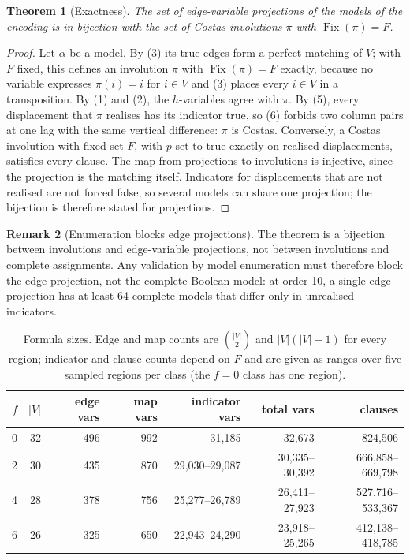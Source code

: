 \documentclass[11pt,a4paper]{article}
\newtheorem{theorem}{Theorem}
\theoremstyle{definition}
\newtheorem{remark}[theorem]{Remark}
\newcommand{\Fix}{\operatorname{Fix}}
\begin{document}
\begin{theorem}[Exactness]\label{thm:exact}
The set of edge-variable projections of the models of the encoding is in bijection with the
set of Costas involutions $\pi$ with $\Fix(\pi)=F$.
\end{theorem}
\begin{proof}
Let $\alpha$ be a model. By (3) its true edges form a perfect matching of $V$; with $F$ fixed,
this defines an involution $\pi$ with $\Fix(\pi)=F$ exactly, because no variable expresses
$\pi(i)=i$ for $i\in V$ and (3) places every $i\in V$ in a transposition. By (1) and (2), the
$h$-variables agree with $\pi$. By (5), every displacement that $\pi$ realises has its
indicator true, so (6) forbids two column pairs at one lag with the same vertical difference:
$\pi$ is Costas. Conversely, a Costas involution with fixed set $F$, with $p$ set to true
exactly on realised displacements, satisfies every clause. The map from projections to
involutions is injective, since the projection is the matching itself. Indicators for
displacements that are not realised are not forced false, so several models can share one
projection; the bijection is therefore stated for projections.
\end{proof}

\begin{remark}[Enumeration blocks edge projections]\label{rem:projblock}
The theorem is a bijection between involutions and edge-variable projections, not between
involutions and complete assignments. Any validation by model enumeration must therefore block the
edge projection, not the complete Boolean model: at order 10, a single edge projection has at least
64 complete models that differ only in unrealised indicators.
\end{remark}

\begin{table}[H]
\centering
\begin{tabular}{@{}rrrrrrr@{}}
\toprule
$f$ & $|V|$ & edge vars & map vars & indicator vars & total vars & clauses \\
\midrule
0 & 32 & 496 & 992 & 31{,}185 & 32{,}673 & 824{,}506 \\
2 & 30 & 435 & 870 & 29{,}030--29{,}087 & 30{,}335--30{,}392 & 666{,}858--669{,}798 \\
4 & 28 & 378 & 756 & 25{,}277--26{,}789 & 26{,}411--27{,}923 & 527{,}716--533{,}367 \\
6 & 26 & 325 & 650 & 22{,}943--24{,}290 & 23{,}918--25{,}265 & 412{,}138--418{,}785 \\
\bottomrule
\end{tabular}
\caption{Formula sizes. Edge and map counts are $\binom{|V|}{2}$ and $|V|(|V|-1)$ for every
region; indicator and clause counts depend on $F$ and are given as ranges over five sampled
regions per class (the $f=0$ class has one region).}
\label{tab:sizes}
\end{table}
\end{document}
